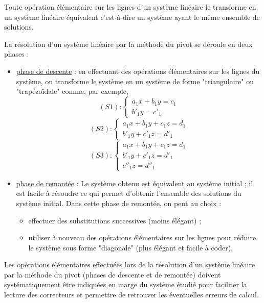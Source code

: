 \begin{prop}
	Toute opération élémentaire sur les lignes d’un système linéaire le transforme en un système linéaire équivalent c’est-à-dire un système ayant le même ensemble de solutions.
\end{prop}

\begin{defprop}
	La résolution d’un système linéaire par la méthode du pivot se déroule en deux phases :
	\begin{itemize}
		\item \underline{phase de descente} : en effectuant des opérations élémentaires sur les lignes du système, on transforme le système en un système de forme "triangulaire" ou "trapézoïdale" comme, par exemple,
		      \[(S1) : \begin{cases} a_1x+b_1y = c_1 \\ b'_1y = c'_1 \end{cases}\]
		      \[(S2) : \begin{cases} a_1x+b_1y+c_1z = d_1 \\ b'_1y+c'_1z = d'_1 \end{cases}\]
		      \[(S3) : \begin{cases} a_1x+b_1y+c_1z = d_1 \\ b'_1y+c'_1z = d'_1 \\ c''_1z = d''_1 \end{cases}\]
		\item \underline{phase de remontée} : Le système obtenu est équivalent au système initial ; il est facile à résoudre ce qui permet d’obtenir l’ensemble des solutions du système initial. Dans cette phase de remontée, on peut au choix :
		      \begin{itemize}
			      \item effectuer des substitutions successives (moins élégant) ;
			      \item utiliser à nouveau des opérations élémentaires sur les lignes pour réduire le système sous forme "diagonale" (plus élégant et facile à coder).
		      \end{itemize}
	\end{itemize}
\end{defprop}
\begin{rem}
	Les opérations élémentaires effectuées lors de la résolution d’un système linéaire par la méthode du pivot (phases de descente et de remontée) doivent systématiquement être indiquées en marge du système étudié pour faciliter la lecture des correcteurs et permettre de retrouver les éventuelles erreurs de calcul.
\end{rem}

